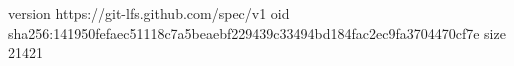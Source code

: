 version https://git-lfs.github.com/spec/v1
oid sha256:141950fefaec51118c7a5beaebf229439c33494bd184fac2ec9fa3704470cf7e
size 21421
